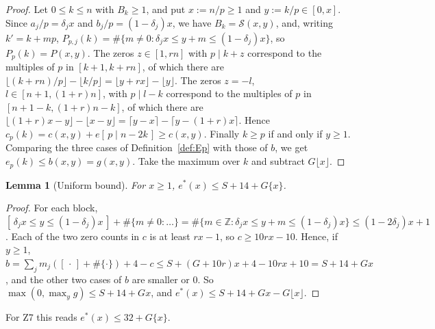 \documentclass[11pt]{amsart}
\newtheorem{lemma}[theorem]{Lemma}
\theoremstyle{definition}
\theoremstyle{remark}
\numberwithin{equation}{section}
\newcommand{\ZZ}{\mathbb{Z}}
\newcommand{\cS}{\mathcal{S}}
\newcommand{\ind}[1]{[\,#1\,]}
\begin{document}
\begin{proof}
Let $0\le k\le n$ with $B_k\ge1$, and put $x:=n/p\ge1$ and $y:=k/p\in[0,x]$. Since $a_j/p=\delta_jx$ and
$b_j/p=(1-\delta_j)x$, we have $B_k=\cS(x,y)$, and, writing $k'=k+mp$,
$P_{p,j}(k)=\#\{m\ne0:\delta_jx\le y+m\le(1-\delta_j)x\}$, so $P_p(k)=P(x,y)$. The zeros $z\in[1,rn]$ with
$p\mid k+z$ correspond to the multiples of $p$ in $[k+1,k+rn]$, of which there are
$\lfloor(k+rn)/p\rfloor-\lfloor k/p\rfloor=\lfloor y+rx\rfloor-\lfloor y\rfloor$. The zeros $z=-l$,
$l\in[n+1,(1+r)n]$, with $p\mid l-k$ correspond to the multiples of $p$ in $[n+1-k,(1+r)n-k]$, of which there are
$\lfloor(1+r)x-y\rfloor-\lfloor x-y\rfloor=\lceil y-x\rceil-\lceil y-(1+r)x\rceil$. Hence
$c_p(k)=c(x,y)+e\ind{p\mid n-2k}\ge c(x,y)$. Finally $k\ge p$ if and only if $y\ge1$. Comparing the three cases
of Definition~\ref{def:Ep} with those of $b$, we get $e_p(k)\le b(x,y)=g(x,y)$. Take the maximum over $k$ and
subtract $G\lfloor x\rfloor$.
\end{proof}

\begin{lemma}[Uniform bound]\label{lem:tail}
For $x\ge1$, $e^*(x)\le S+14+G\{x\}$.
\end{lemma}

\begin{proof}
For each block, $\ind{\delta_jx\le y\le(1-\delta_j)x}+\#\{m\ne0:\dots\}=\#\{m\in\ZZ:\delta_jx\le y+m\le(1-\delta_j)x\}
\le(1-2\delta_j)x+1$. Each of the two zero counts in $c$ is at least $rx-1$, so $c\ge10rx-10$. Hence, if $y\ge1$,
$b=\sum_jm_j(\ind{\cdot}+\#\{\cdot\})+4-c\le S+(G+10r)x+4-10rx+10=S+14+Gx$, and the other two cases of $b$
are smaller or $0$. So $\max(0,\max_yg)\le S+14+Gx$, and $e^*(x)\le S+14+Gx-G\lfloor x\rfloor$.
\end{proof}

For Z7 this reads $e^*(x)\le32+G\{x\}$.
\end{document}
